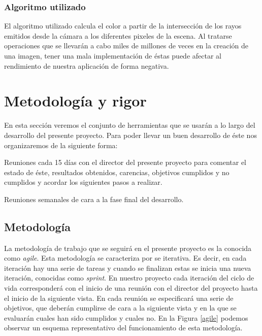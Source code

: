 \documentclass[titlepage,12pt]{report}
\begin{document}
\subsubsection{Algoritmo utilizado}

El algoritmo utilizado calcula el color a partir de la intersección de los rayos emitidos desde la cámara a los diferentes pixeles de la escena. Al tratarse operaciones que se llevarán a cabo miles de millones de veces en la creación de una imagen, tener una mala implementación de éstas puede afectar al rendimiento de nuestra aplicación de forma negativa.

\section{Metodología y rigor}

En esta sección veremos el conjunto de herramientas que se usarán a lo largo del desarrollo del presente proyecto. Para poder llevar un buen desarrollo de éste nos organizaremos de la siguiente forma: \begin{enumerate*}[label=\roman*)] \item Reuniones cada 15 días con el director del presente proyecto para comentar el estado de éste, resultados obtenidos, carencias, objetivos cumplidos y no cumplidos y acordar los siguientes pasos a realizar. \item Reuniones semanales de cara a la fase final del desarrollo. \end{enumerate*}

\subsection{Metodología}

La metodología de trabajo que se seguirá en el presente proyecto es la conocida como \textit{agile}. Esta metodología se caracteriza por se iterativa. Es decir, en cada iteración hay una serie de tareas y cuando se finalizan estas se inicia una nueva iteración, conocidas como \textit{sprint}. En nuestro proyecto cada iteración del ciclo de vida corresponderá con el inicio de una reunión con el director del proyecto hasta el inicio de la siguiente vista. En cada reunión se especificará una serie de objetivos, que deberán cumplirse de cara a la siguiente vista y en la que se evaluarán cuales han sido cumplidos y cuales no. En la Figura \ref{agile} podemos observar un esquema representativo del funcionamiento de esta metodología.
\end{document}
